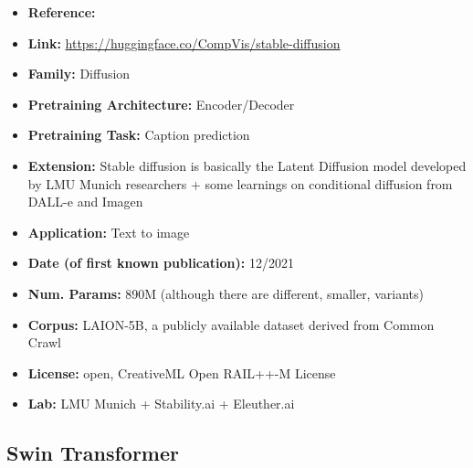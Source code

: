 \documentclass{article}
\begin{document}
            \begin{itemize}
                \item \textbf{Reference:} 
                \item \textbf{Link:} \url{https://huggingface.co/CompVis/stable-diffusion}
                \item \textbf{Family:} Diffusion 
                \item \textbf{Pretraining Architecture:} Encoder/Decoder
                \item \textbf{Pretraining Task:} Caption prediction
                \item \textbf{Extension:} Stable diffusion is basically the Latent Diffusion model developed by LMU Munich researchers + some learnings on conditional diffusion from DALL-e and Imagen  
                \item \textbf{Application:} Text to image 
                \item \textbf{Date (of first known publication):} 12/2021
                \item \textbf{Num. Params:} 890M (although there are different, smaller, variants)
                \item \textbf{Corpus:} LAION-5B, a publicly available dataset derived from Common Crawl
                \item \textbf{License:} open, CreativeML Open RAIL++-M License
                \item \textbf{Lab:} LMU Munich + Stability.ai + Eleuther.ai
            \end{itemize}

\subsection{Swin Transformer}
\end{document}
